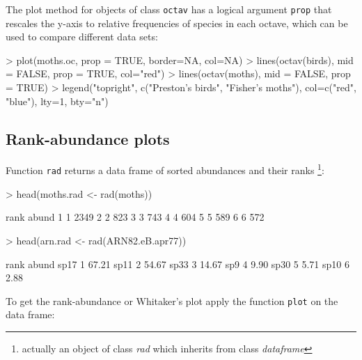\documentclass[11pt, A4]{article}
\newcommand{\code}[1]{\texttt{#1}}
\begin{document}
The plot method for objects of class \code{octav} has 
a logical argument \code{prop} that rescales the y-axis to relative frequencies of species in each octave,
which can be used to compare different data sets:

\begin{Schunk}
\begin{Sinput}
> plot(moths.oc, prop = TRUE, border=NA, col=NA)
> lines(octav(birds), mid = FALSE, prop = TRUE, col="red")
> lines(octav(moths), mid = FALSE, prop = TRUE)
> legend("topright", c("Preston's birds", "Fisher's moths"), col=c("red", "blue"), lty=1, bty="n")
\end{Sinput}
\end{Schunk}


\subsection{Rank-abundance plots}
\label{sec:rank_abund}
Function \code{rad} returns a data frame of sorted abundances and their ranks 
\footnote{actually an object of class \emph{rad} which inherits from class \emph{dataframe}}:

\begin{Schunk}
\begin{Sinput}
> head(moths.rad <- rad(moths))
\end{Sinput}
\begin{Soutput}
  rank abund
1    1  2349
2    2   823
3    3   743
4    4   604
5    5   589
6    6   572
\end{Soutput}
\begin{Sinput}
> head(arn.rad <- rad(ARN82.eB.apr77))
\end{Sinput}
\begin{Soutput}
     rank abund
sp17    1 67.21
sp11    2 54.67
sp33    3 14.67
sp9     4  9.90
sp30    5  5.71
sp10    6  2.88
\end{Soutput}
\end{Schunk}

To get the rank-abundance or Whitaker's plot apply the function \code{plot} on the data frame:
\end{document}
